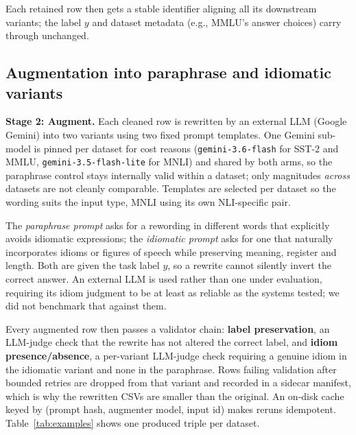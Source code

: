 \documentclass{article}   %
\begin{document}
Each retained row then gets a stable identifier aligning all its downstream
variants; the label $y$ and dataset metadata (e.g., MMLU's answer choices)
carry through unchanged.

\subsection{Augmentation into paraphrase and idiomatic variants}
\label{sec:augmentation}

\textbf{Stage 2: Augment.} Each cleaned row is rewritten by an external LLM
(Google Gemini) into two variants using two fixed prompt templates. One Gemini
sub-model is pinned per dataset for cost reasons (\texttt{gemini-3.6-flash} for
SST-2 and MMLU, \texttt{gemini-3.5-flash-lite} for MNLI) and shared by both
arms, so the paraphrase control stays internally valid within a dataset; only
magnitudes \emph{across} datasets are not cleanly comparable. Templates are
selected per dataset so the wording suits the input type, MNLI using its own
NLI-specific pair.

The \emph{paraphrase prompt} asks for a rewording in different words that
explicitly avoids idiomatic expressions; the \emph{idiomatic prompt} asks for
one that naturally incorporates idioms or figures of speech while preserving
meaning, register and length. Both are given the task label $y$, so a rewrite
cannot silently invert the correct answer. An external LLM is used rather than
one under evaluation, requiring its idiom judgment to be at least as reliable
as the systems tested; we did not benchmark that against them.

Every augmented row then passes a validator chain: \textbf{label
preservation}, an LLM-judge check that the rewrite has not altered the correct
label, and \textbf{idiom presence/absence}, a per-variant LLM-judge check
requiring a genuine idiom in the idiomatic variant and none in the paraphrase.
Rows failing validation after bounded retries are dropped from that variant and
recorded in a sidecar manifest, which is why the rewritten CSVs are smaller than
the original. An on-disk cache keyed by (prompt hash, augmenter model, input id)
makes reruns idempotent. Table~\ref{tab:examples} shows one produced triple per
dataset.
\end{document}
